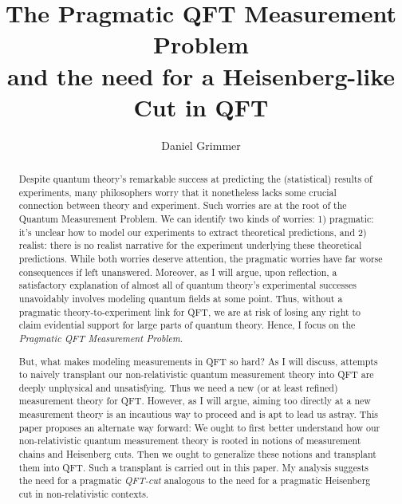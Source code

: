 \documentclass[12pt,prd,superscriptaddress,floatfix,amsmath,amssymb,amsfonts,nofootinbib]{revtex4-2}
\begin{document}
\title{The Pragmatic QFT Measurement Problem\\ and the need for a Heisenberg-like Cut in QFT}

\author{Daniel Grimmer}

\begin{abstract}
Despite quantum theory's remarkable success at predicting the (statistical) results of experiments, many philosophers worry that it nonetheless lacks some crucial connection between theory and experiment. Such worries are at the root of the Quantum Measurement Problem. We can identify two kinds of worries: 1) pragmatic: it's unclear how to model our experiments to extract theoretical predictions, and 2) realist: there is no realist narrative for the experiment underlying these theoretical predictions. While both worries deserve attention, the pragmatic worries have far worse consequences if left unanswered. Moreover, as I will argue, upon reflection, a satisfactory explanation of almost all of quantum theory's experimental successes unavoidably involves modeling quantum fields at some point. Thus, without a pragmatic theory-to-experiment link for QFT, we are at risk of losing any right to claim evidential support for large parts of quantum theory. Hence, I focus on the \textit{Pragmatic QFT Measurement Problem}.

But, what makes modeling measurements in QFT so hard? As I will discuss, attempts to naively transplant our non-relativistic quantum measurement theory into QFT are deeply unphysical and unsatisfying. Thus we need a new (or at least refined) measurement theory for QFT. However, as I will argue, aiming too directly at a new measurement theory is an incautious way to proceed and is apt to lead us astray. This paper proposes an alternate way forward: We ought to first better understand how our non-relativistic quantum measurement theory is rooted in notions of measurement chains and Heisenberg cuts. Then we ought to generalize these notions and transplant them into QFT. Such a transplant is carried out in this paper. My analysis suggests the need for a pragmatic \textit{QFT-cut} analogous to the need for a pragmatic Heisenberg cut in non-relativistic contexts.
\end{abstract}
\end{document}
